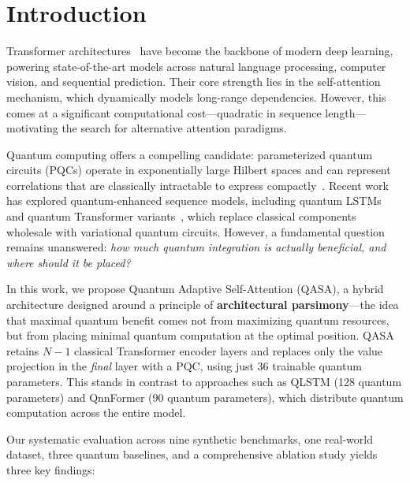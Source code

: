 \documentclass[conference]{IEEEtran}
\begin{document}
\section{Introduction}
Transformer architectures~\cite{vaswani2017attention} have become the backbone of modern deep learning, powering state-of-the-art models across natural language processing, computer vision, and sequential prediction. Their core strength lies in the self-attention mechanism, which dynamically models long-range dependencies. However, this comes at a significant computational cost---quadratic in sequence length---motivating the search for alternative attention paradigms.

Quantum computing offers a compelling candidate: parameterized quantum circuits (PQCs) operate in exponentially large Hilbert spaces and can represent correlations that are classically intractable to express compactly~\cite{havlicek2019supervised}. Recent work has explored quantum-enhanced sequence models, including quantum LSTMs~\cite{chen2022quantum} and quantum Transformer variants~\cite{cai2024qnnformer}, which replace classical components wholesale with variational quantum circuits. However, a fundamental question remains unanswered: \emph{how much quantum integration is actually beneficial, and where should it be placed?}

In this work, we propose Quantum Adaptive Self-Attention (QASA), a hybrid architecture designed around a principle of \textbf{architectural parsimony}---the idea that maximal quantum benefit comes not from maximizing quantum resources, but from placing minimal quantum computation at the optimal position. QASA retains $N{-}1$ classical Transformer encoder layers and replaces only the value projection in the \emph{final} layer with a PQC, using just 36 trainable quantum parameters. This stands in contrast to approaches such as QLSTM (128 quantum parameters) and QnnFormer (90 quantum parameters), which distribute quantum computation across the entire model.

Our systematic evaluation across nine synthetic benchmarks, one real-world dataset, three quantum baselines, and a comprehensive ablation study yields three key findings:
\end{document}
